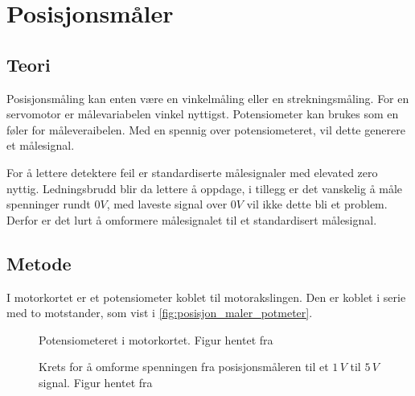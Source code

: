\section{Posisjonsmåler}
\label{sec:pos_måler}

\subsection{Teori}



Posisjonsmåling kan enten være en vinkelmåling eller en strekningsmåling. For en servomotor er målevariabelen vinkel nyttigst. Potensiometer kan brukes som en føler for måleveraibelen. Med en spennig over potensiometeret, vil dette generere et målesignal.

For å lettere detektere feil er standardiserte målesignaler med elevated zero nyttig. Ledningsbrudd blir da lettere å oppdage, i tillegg er det vanskelig å måle spenninger rundt $0V$, med laveste signal over $0V$ vil ikke dette bli et problem. Derfor er det lurt å omformere målesignalet til et standardisert målesignal.

\subsection{Metode}

I motorkortet er et potensiometer koblet til motorakslingen. Den er koblet i serie med to motstander, som vist i \autoref{fig:posisjon_maler_potmeter}.

\begin{figure}[h]
    \centering
    
    \caption{Potensiometeret i motorkortet. Figur hentet fra \cite{AnalogMotorlabbOppgaver}}
    \label{fig:posisjon_maler_potmeter}
\end{figure}

\begin{figure}[h]
    \centering
    
    \caption{Krets for å omforme spenningen fra posisjonsmåleren til et $1\,V$ til $5\,V$ signal. Figur hentet fra \cite{AnalogMotorlabbOppgaver}}
    \label{fig:krets_posisjons_maler}
\end{figure}

